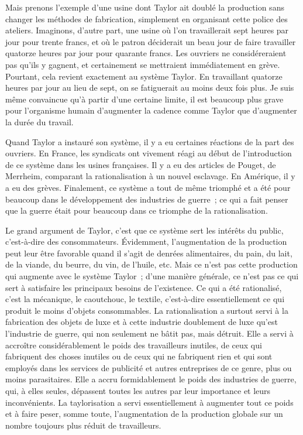 \documentclass[french,twoside]{book} %
\begin{document}
Mais prenons l'exemple d'une usine dont Taylor ait doublé la production sans changer les méthodes de fabrication, simplement en organisant cette police des ateliers. Imaginons, d'autre part, une usine où l'on travaillerait sept heures par jour pour trente francs, et où le patron déciderait un beau jour de faire travailler quatorze heures par jour pour quarante francs. Les ouvriers ne considéreraient pas qu'ils y gagnent, et certainement se mettraient immédiatement en grève. Pourtant, cela revient exactement au système Taylor. En travaillant quatorze heures par jour au lieu de sept, on se fatiguerait au moins deux fois plus. Je suis même convaincue qu'à partir d'une certaine limite, il est beaucoup plus grave pour l'organisme humain d'augmenter la cadence comme Taylor que d'augmenter la durée du travail.\par
Quand Taylor a instauré son système, il y a eu certaines réactions de la part des ouvriers. En France, les syndicats ont vivement réagi au début de l'introduction de ce système dans les usines françaises. Il y a eu des articles de Pouget, de Merrheim, comparant la rationalisation à un nouvel esclavage. En Amérique, il y a eu des grèves. Finalement, ce système a tout de même triomphé et a été pour beaucoup dans le développement des industries de guerre ; ce qui a fait penser que la guerre était pour beaucoup dans ce triomphe de la rationalisation.\par
\par
Le grand argument de Taylor, c'est que ce système sert les intérêts du public, c'est-à-dire des consommateurs. Évidemment, l'augmentation de la production peut leur être favorable quand il s'agit de denrées alimentaires, du pain, du lait, de la viande, du beurre, du vin, de l'huile, etc. Mais ce n'est pas cette production qui augmente avec le système Taylor ; d'une manière générale, ce n'est pas ce qui sert à satisfaire les principaux besoins de l'existence. Ce qui a été rationalisé, c'est la mécanique, le caoutchouc, le textile, c'est-à-dire essentiellement ce qui produit le moins d'objets consommables. La rationalisation a surtout servi à la fabrication des objets de luxe et à cette industrie doublement de luxe qu'est l'industrie de guerre, qui non seulement ne bâtit pas, mais détruit. Elle a servi à accroître considérablement le poids des travailleurs inutiles, de ceux qui fabriquent des choses inutiles ou de ceux qui ne fabriquent rien et qui sont employés dans les services de publicité et autres entreprises de ce genre, plus ou moins parasitaires. Elle a accru formidablement le poids des industries de guerre, qui, à elles seules, dépassent toutes les autres par leur importance et leurs inconvénients. La taylorisation a servi essentiellement à augmenter tout ce poids et à faire peser, somme toute, l'augmentation de la production globale sur un nombre toujours plus réduit de travailleurs.\par
\end{document}
